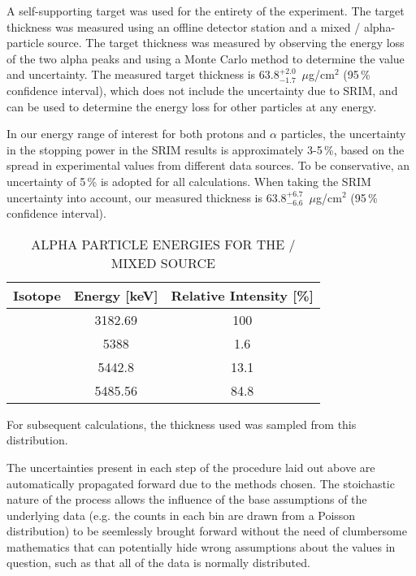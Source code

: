 A self-supporting  target was used for the entirety of the
experiment. The target thickness was measured using an offline detector
station and a mixed / alpha-particle source. The
target thickness was measured by observing the energy loss of the two
alpha peaks and using a Monte Carlo method to determine the value and
uncertainty. The measured target thickness is
$63.8^{+2.0}_{-1.7}$~$\mu$g/cm${}^{2}$ (95\,\% confidence interval), which does
not include the uncertainty due to SRIM, and can be used to determine the
energy loss for other particles at any energy.

In our energy range of interest for both protons and $\alpha$ particles, the
uncertainty in the stopping power in the SRIM results is approximately 3-5\,\%,
based on the spread in experimental values from different data sources. To be
conservative, an uncertainty of 5\,\% is adopted for all calculations. When
taking the SRIM uncertainty into account, our measured thickness is
$63.8^{+6.7}_{-6.6}$~$\mu$g/cm${}^{2}$ (95\,\% confidence interval).


\begin{table}
    \begin{center}
        \caption{ALPHA PARTICLE ENERGIES FOR THE /
            MIXED SOURCE}
        \label{tab:mixed-source}
        \begin{tabular}{rS[table-format=2.4]S[table-format=2.4]}
            \toprule
            \midrule
            {\textbf{Isotope}} & {\textbf{Energy [keV]}} &
                {\textbf{Relative Intensity [\%]}} \\
            \midrule
             & 3182.69 & 100   \\
             & 5388    &   1.6 \\
                          & 5442.8  &  13.1 \\
                          & 5485.56 &  84.8 \\
            \bottomrule
        \end{tabular}
    \end{center}
\end{table}

For subsequent calculations, the
thickness used was sampled from this distribution.

The uncertainties present in each step of the procedure laid out above
are automatically propagated forward due to the methods chosen. The
stoichastic nature of the process allows the influence of the base
assumptions of the underlying data (e.g. the counts in each bin are
drawn from a Poisson distribution) to be seemlessly brought forward
without the need of clumbersome mathematics that can potentially hide
wrong assumptions about the values in question, such as that all of the
data is normally distributed.

